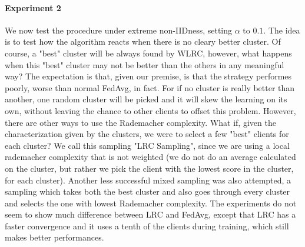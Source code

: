 \documentclass{article}
\begin{document}
\paragraph{Experiment 2}
We now test the procedure under extreme non-IIDness, setting $\alpha$ to $0.1$. The idea is to test how the algorithm reacts when there is no cleary better cluster. Of course, a "best" cluster will be always found by WLRC, however, what happens when this "best" cluster may not be better than the others in any meaningful way? The expectation is that, given our premise, is that the strategy performes  poorly, worse than normal FedAvg, in fact. For if no cluster is really better than another, one random cluster will be picked and it will skew the learning on its own, without leaving the chance to other clients to offset this problem. However, there are other ways to use the Rademacher complexity. What if, given the characterization given by the clusters, we were to select a few "best" clients for each cluster? We call this sampling "LRC Sampling", since we are using a local rademacher complexity that is not weighted (we do not do an average calculated on the cluster, but rather we pick the client with the lowest score in the cluster, for each cluster).
Another less successful mixed sampling was also attempted, a sampling which takes both the best cluster and also goes through every cluster and selects the one with lowest Rademacher complexity.
The experiments do not seem to show much difference between LRC and FedAvg, except that LRC has a faster convergence and it uses a tenth of the clients during training, which still makes better performances.





\end{document}
